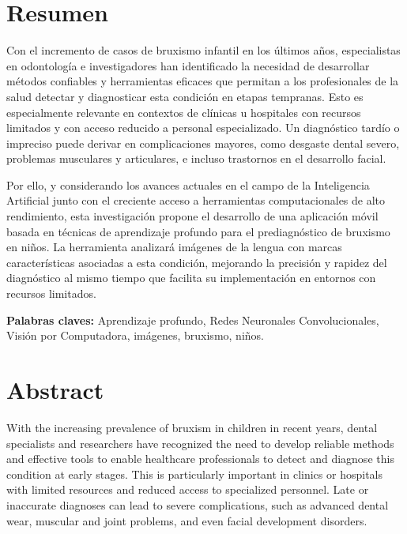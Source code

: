 
\chapter*{Resumen}

Con el incremento de casos de bruxismo infantil en los últimos años, especialistas en odontología e investigadores han identificado la necesidad de desarrollar métodos confiables y herramientas eficaces que permitan a los profesionales de la salud detectar y diagnosticar esta condición en etapas tempranas. Esto es especialmente relevante en contextos de clínicas u hospitales con recursos limitados y con acceso reducido a personal especializado. Un diagnóstico tardío o impreciso puede derivar en complicaciones mayores, como desgaste dental severo, problemas musculares y articulares, e incluso trastornos en el desarrollo facial.

Por ello, y considerando los avances actuales en el campo de la Inteligencia Artificial junto con el creciente acceso a herramientas computacionales de alto rendimiento, esta investigación propone el desarrollo de una aplicación móvil basada en técnicas de aprendizaje profundo para el prediagnóstico de bruxismo en niños. La herramienta analizará imágenes de la lengua con marcas características asociadas a esta condición, mejorando la precisión y rapidez del diagnóstico al mismo tiempo que facilita su implementación en entornos con recursos limitados.


\textbf{Palabras claves: } Aprendizaje profundo, Redes Neuronales Convolucionales, Visión por Computadora, imágenes, bruxismo, niños.

\clearpage
\chapter*{Abstract}

With the increasing prevalence of bruxism in children in recent years, dental specialists and researchers have recognized the need to develop reliable methods and effective tools to enable healthcare professionals to detect and diagnose this condition at early stages. This is particularly important in clinics or hospitals with limited resources and reduced access to specialized personnel. Late or inaccurate diagnoses can lead to severe complications, such as advanced dental wear, muscular and joint problems, and even facial development disorders.

